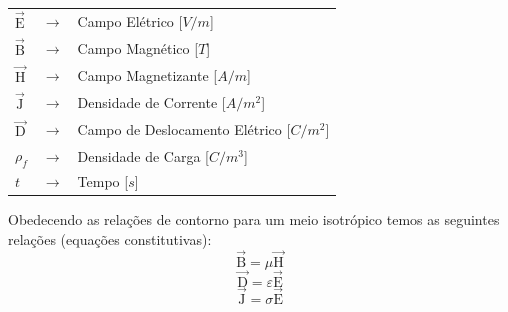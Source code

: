             {\footnotesize \noindent
            
            \begin{table}[H]
             \begin{tabular*}{1cm}{p{0.05cm}p{0.1cm}p{10cm}}
               {\footnotesize $\vec{\textrm{E}}$}  & {\footnotesize $\rightarrow$} & {\footnotesize Campo Elétrico [$V/m$] }\\
               {\footnotesize $\vec{\textrm{B}}$}  & {\footnotesize $\rightarrow$} & {\footnotesize Campo Magnético [$T$] }\\
               {\footnotesize $\vec{\textrm{H}}$}  & {\footnotesize $\rightarrow$} & {\footnotesize Campo Magnetizante [$A/m$]} \\
               {\footnotesize $\vec{\textrm{J}}$}  & {\footnotesize $\rightarrow$} & {\footnotesize Densidade de Corrente [$A/m^2$]} \\
               {\footnotesize $\vec{\textrm{D}}$}  & {\footnotesize $\rightarrow$} & {\footnotesize Campo de Deslocamento Elétrico [$C/m^2$]} \\
               {\footnotesize $\rho_f$}            & {\footnotesize $\rightarrow$} & {\footnotesize Densidade de Carga [$C/m^3$]} \\
               {\footnotesize $t$ }                & {\footnotesize $\rightarrow$} & {\footnotesize Tempo [$s$]}
             \end{tabular*}

            \end{table}}

            Obedecendo as relações de contorno para um meio isotrópico temos as seguintes
            relações (equações constitutivas):
            \begin{equation}
                \label{con_B}
                \vec{\textrm{B}} = \mu \vec{\textrm{H}}
            \end{equation}
            \begin{equation}
                \label{con_D}
                \vec{\textrm{D}} = \varepsilon  \vec{\textrm{E}}
            \end{equation}
            \begin{equation}
                \label{con_J}
                \vec{\textrm{J}} = \sigma \vec{\textrm{E}}
            \end{equation}
	    
